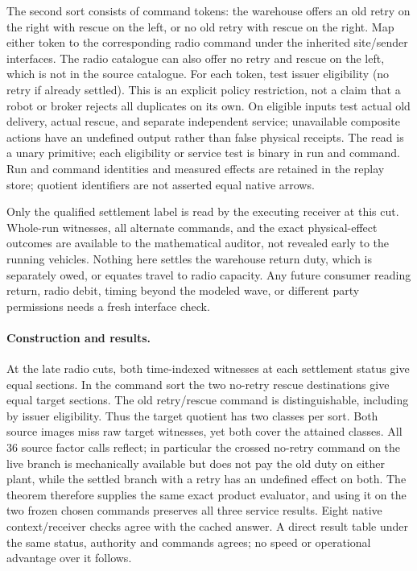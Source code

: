 \documentclass[11pt]{article}
\begin{document}
The second sort consists of command tokens: the warehouse offers an
old retry on the right with rescue on the left, or no old retry
with rescue on the right. Map either token to the corresponding
radio command under the inherited site/sender interfaces. The radio
catalogue can also offer no retry and rescue on the left, which is
not in the source catalogue. For each token, test issuer eligibility
(no retry if already settled). This is an explicit policy restriction,
not a claim that a robot or broker rejects all duplicates on its own.
On eligible inputs test actual old delivery, actual rescue, and
separate independent service; unavailable composite actions have an
undefined output rather than false physical receipts. The read is
a unary primitive; each eligibility or service test is binary in
run and command. Run and command identities and measured effects
are retained in the replay store; quotient identifiers are not
asserted equal native arrows.

Only the qualified settlement label is read by the executing
receiver at this cut. Whole-run witnesses, all alternate commands,
and the exact physical-effect outcomes are available to the
mathematical auditor, not revealed early to the running vehicles.
Nothing here settles the warehouse return duty, which is separately
owed, or equates travel to radio capacity. Any future consumer
reading return, radio debit, timing beyond the modeled wave, or
different party permissions needs a fresh interface check.

\paragraph{Construction and results.}
At the late radio cuts, both time-indexed witnesses at each
settlement status give equal sections. In the command sort the two
no-retry rescue destinations give equal target sections. The old
retry/rescue command is distinguishable, including by issuer
eligibility. Thus the target quotient has two classes per sort.
Both source images miss raw target witnesses, yet both cover the
attained classes. All 36 source factor calls reflect; in particular
the crossed no-retry command on the live branch is mechanically
available but does not pay the old duty on either plant, while
the settled branch with a retry has an undefined effect on both.
The theorem therefore supplies the same exact product evaluator,
and using it on the two frozen chosen commands preserves all three
service results. Eight native context/receiver checks agree with
the cached answer. A direct result table under the same status,
authority and commands agrees; no speed or operational advantage
over it follows.
\end{document}
